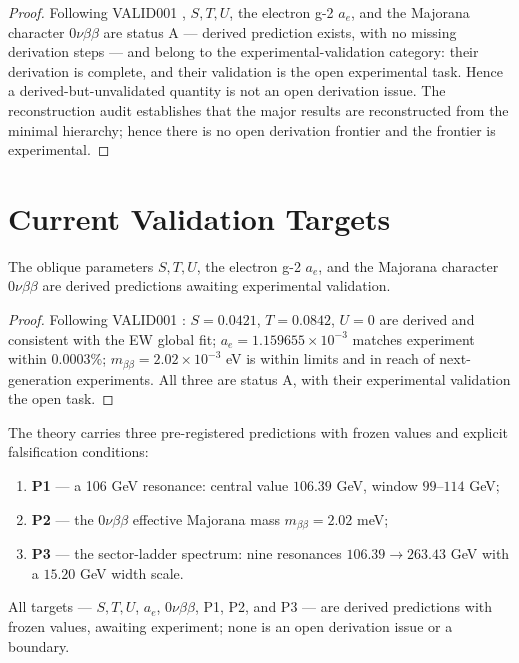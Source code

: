 \begin{proof}
Following VALID001 \cite{c14:VALID001}, $S,T,U$, the electron g-2 $a_e$, and the Majorana
character $0\nu\beta\beta$ are status A --- derived prediction exists, with no missing
derivation steps --- and belong to the experimental-validation category: their derivation is
complete, and their validation is the open experimental task. Hence a derived-but-unvalidated
quantity is not an open derivation issue. The reconstruction audit \cite{c14:MONO110A}
establishes that the major results are reconstructed from the minimal hierarchy; hence there
is no open derivation frontier and the frontier is experimental.
\end{proof}

\section{Current Validation Targets}
\label{c14:sec:validation-targets}

\begin{theorem}
\label{c14:thm:precision-validation}
The oblique parameters $S,T,U$, the electron g-2 $a_e$, and the Majorana character
$0\nu\beta\beta$ are derived predictions awaiting experimental validation.
\end{theorem}

\begin{proof}
Following VALID001 \cite{c14:VALID001}: $S = 0.0421$, $T = 0.0842$, $U = 0$ are derived and
consistent with the EW global fit; $a_e = 1.159655\times10^{-3}$ matches experiment within
$0.0003\%$; $m_{\beta\beta} = 2.02\times10^{-3}$ eV is within limits and in reach of
next-generation experiments. All three are status A, with their experimental validation the
open task.
\end{proof}

\begin{theorem}
\label{c14:thm:pre-registered}
The theory carries three pre-registered predictions with frozen values and explicit
falsification conditions:
\begin{enumerate}
\item \textbf{P1} --- a 106 GeV resonance: central value $106.39$ GeV, window
$99$--$114$ GeV;
\item \textbf{P2} --- the $0\nu\beta\beta$ effective Majorana mass $m_{\beta\beta} =
2.02$ meV;
\item \textbf{P3} --- the sector-ladder spectrum: nine resonances
$106.39 \to 263.43$ GeV with a $15.20$ GeV width scale.
\end{enumerate}
All targets --- $S,T,U$, $a_e$, $0\nu\beta\beta$, P1, P2, and P3 --- are derived predictions
with frozen values, awaiting experiment; none is an open derivation issue or a boundary.
\end{theorem}

